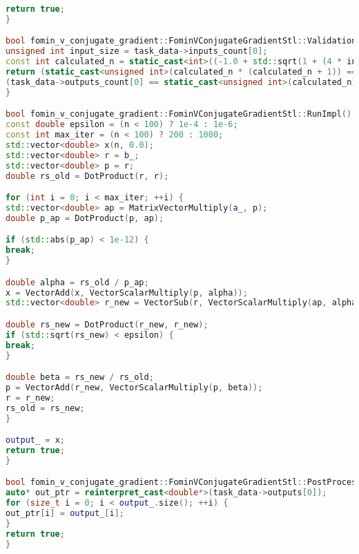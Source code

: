 \documentclass[12pt]{article}
\begin{document}
\begin{lstlisting}[language=C++]
return true;
}

bool fomin_v_conjugate_gradient::FominVConjugateGradientStl::ValidationImpl() {
unsigned int input_size = task_data->inputs_count[0];
const int calculated_n = static_cast<int>((-1.0 + std::sqrt(1 + (4 * input_size))) / 2);
return (static_cast<unsigned int>(calculated_n * (calculated_n + 1)) == input_size) &&
(task_data->outputs_count[0] == static_cast<unsigned int>(calculated_n));
}

bool fomin_v_conjugate_gradient::FominVConjugateGradientStl::RunImpl() {
const double epsilon = (n < 100) ? 1e-4 : 1e-6;
const int max_iter = (n < 100) ? 200 : 1000;
std::vector<double> x(n, 0.0);
std::vector<double> r = b_;
std::vector<double> p = r;
double rs_old = DotProduct(r, r);

for (int i = 0; i < max_iter; ++i) {
std::vector<double> ap = MatrixVectorMultiply(a_, p);
double p_ap = DotProduct(p, ap);

if (std::abs(p_ap) < 1e-12) {
break;
}

double alpha = rs_old / p_ap;
x = VectorAdd(x, VectorScalarMultiply(p, alpha));
std::vector<double> r_new = VectorSub(r, VectorScalarMultiply(ap, alpha));

double rs_new = DotProduct(r_new, r_new);
if (std::sqrt(rs_new) < epsilon) {
break;
}

double beta = rs_new / rs_old;
p = VectorAdd(r_new, VectorScalarMultiply(p, beta));
r = r_new;
rs_old = rs_new;
}

output_ = x;
return true;
}

bool fomin_v_conjugate_gradient::FominVConjugateGradientStl::PostProcessingImpl() {
auto* out_ptr = reinterpret_cast<double*>(task_data->outputs[0]);
for (size_t i = 0; i < output_.size(); ++i) {
out_ptr[i] = output_[i];
}
return true;
}
\end{lstlisting}
  
\newpage
\end{document}
